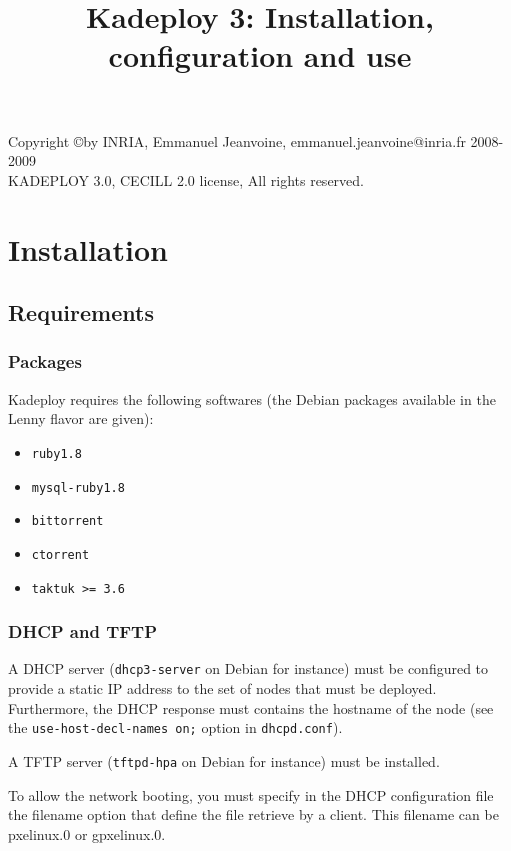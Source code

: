 \documentclass[a4wide,10pt,oneside]{book}
\title{Kadeploy 3: Installation, configuration and use}
\begin{document}
\maketitle

\vspace*{18cm}
\noindent Copyright \copyright by INRIA, Emmanuel Jeanvoine, emmanuel.jeanvoine@inria.fr 2008-2009\\
KADEPLOY 3.0, CECILL 2.0 license, All rights reserved.

\tableofcontents

\chapter{Installation}
\section{Requirements}
\subsection{Packages}\label{sec:required-packages}
Kadeploy requires the following softwares (the Debian packages available in the Lenny flavor are given):
\begin{itemize}
\item \texttt{ruby1.8}
\item \texttt{mysql-ruby1.8}
\item \texttt{bittorrent}
\item \texttt{ctorrent}
\item \texttt{taktuk >= 3.6}
\end{itemize}

\subsection{DHCP and TFTP}
A DHCP server (\texttt{dhcp3-server} on Debian for instance) must be configured to provide a static IP address to the set of nodes that must be deployed. Furthermore, the DHCP response must contains the hostname of the node (see the \texttt{use-host-decl-names on;} option in \texttt{dhcpd.conf}).

A TFTP server (\texttt{tftpd-hpa} on Debian for instance) must be installed.

To allow the network booting, you must specify in the DHCP configuration file the filename option that define the file retrieve by a client. This filename can be pxelinux.0 or gpxelinux.0.
\end{document}
